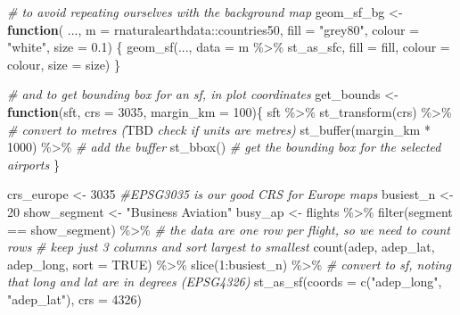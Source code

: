 \documentclass[
]{book}
\newenvironment{Shaded}{\begin{snugshade}}{\end{snugshade}}
\newcommand{\AlertTok}[1]{\textcolor[rgb]{0.94,0.16,0.16}{#1}}
\newcommand{\AttributeTok}[1]{\textcolor[rgb]{0.77,0.63,0.00}{#1}}
\newcommand{\CommentTok}[1]{\textcolor[rgb]{0.56,0.35,0.01}{\textit{#1}}}
\newcommand{\ConstantTok}[1]{\textcolor[rgb]{0.00,0.00,0.00}{#1}}
\newcommand{\ControlFlowTok}[1]{\textcolor[rgb]{0.13,0.29,0.53}{\textbf{#1}}}
\newcommand{\DecValTok}[1]{\textcolor[rgb]{0.00,0.00,0.81}{#1}}
\newcommand{\FloatTok}[1]{\textcolor[rgb]{0.00,0.00,0.81}{#1}}
\newcommand{\FunctionTok}[1]{\textcolor[rgb]{0.00,0.00,0.00}{#1}}
\newcommand{\NormalTok}[1]{#1}
\newcommand{\OtherTok}[1]{\textcolor[rgb]{0.56,0.35,0.01}{#1}}
\newcommand{\SpecialCharTok}[1]{\textcolor[rgb]{0.00,0.00,0.00}{#1}}
\newcommand{\StringTok}[1]{\textcolor[rgb]{0.31,0.60,0.02}{#1}}
\begin{document}
\begin{Shaded}
\begin{Highlighting}[]
\CommentTok{\# to avoid repeating ourselves with the background map}
\NormalTok{geom\_sf\_bg }\OtherTok{\textless{}{-}} \ControlFlowTok{function}\NormalTok{( ..., }\AttributeTok{m =}\NormalTok{ rnaturalearthdata}\SpecialCharTok{::}\NormalTok{countries50,}
                       \AttributeTok{fill =} \StringTok{"grey80"}\NormalTok{, }\AttributeTok{colour =} \StringTok{"white"}\NormalTok{, }\AttributeTok{size =} \FloatTok{0.1}\NormalTok{) \{}
  \FunctionTok{geom\_sf}\NormalTok{(..., }\AttributeTok{data =}\NormalTok{ m }\SpecialCharTok{\%\textgreater{}\%}\NormalTok{ st\_as\_sfc, }
          \AttributeTok{fill =}\NormalTok{ fill, }\AttributeTok{colour =}\NormalTok{ colour, }\AttributeTok{size =}\NormalTok{ size)}
\NormalTok{\}}

\CommentTok{\# and to get bounding box for an sf, in plot coordinates}
\NormalTok{get\_bounds }\OtherTok{\textless{}{-}} \ControlFlowTok{function}\NormalTok{(sft, }\AttributeTok{crs =} \DecValTok{3035}\NormalTok{, }\AttributeTok{margin\_km =} \DecValTok{100}\NormalTok{)\{}
\NormalTok{  sft }\SpecialCharTok{\%\textgreater{}\%} 
    \FunctionTok{st\_transform}\NormalTok{(crs) }\SpecialCharTok{\%\textgreater{}\%} \CommentTok{\# convert to metres (}\AlertTok{TBD}\CommentTok{ check if units are metres)}
    \FunctionTok{st\_buffer}\NormalTok{(margin\_km }\SpecialCharTok{*} \DecValTok{1000}\NormalTok{) }\SpecialCharTok{\%\textgreater{}\%}  \CommentTok{\# add the buffer}
    \FunctionTok{st\_bbox}\NormalTok{() }\CommentTok{\# get the bounding box for the selected airports}
\NormalTok{\}}

\NormalTok{crs\_europe }\OtherTok{\textless{}{-}} \DecValTok{3035} \CommentTok{\#EPSG3035 is our good CRS for Europe maps}
\NormalTok{busiest\_n }\OtherTok{\textless{}{-}} \DecValTok{20}
\NormalTok{show\_segment }\OtherTok{\textless{}{-}} \StringTok{"Business Aviation"}
\NormalTok{busy\_ap }\OtherTok{\textless{}{-}}\NormalTok{ flights }\SpecialCharTok{\%\textgreater{}\%} 
  \FunctionTok{filter}\NormalTok{(segment }\SpecialCharTok{==}\NormalTok{ show\_segment) }\SpecialCharTok{\%\textgreater{}\%} 
  \CommentTok{\# the data are one row per flight, so we need to count rows}
  \CommentTok{\# keep just 3 columns and sort largest to smallest}
  \FunctionTok{count}\NormalTok{(adep, adep\_lat, adep\_long, }\AttributeTok{sort =} \ConstantTok{TRUE}\NormalTok{) }\SpecialCharTok{\%\textgreater{}\%} 
  \FunctionTok{slice}\NormalTok{(}\DecValTok{1}\SpecialCharTok{:}\NormalTok{busiest\_n) }\SpecialCharTok{\%\textgreater{}\%} 
  \CommentTok{\# convert to sf, noting that long and lat are in degrees (EPSG4326)}
  \FunctionTok{st\_as\_sf}\NormalTok{(}\AttributeTok{coords =} \FunctionTok{c}\NormalTok{(}\StringTok{"adep\_long"}\NormalTok{, }\StringTok{"adep\_lat"}\NormalTok{), }\AttributeTok{crs =} \DecValTok{4326}\NormalTok{)}


\end{Highlighting}
\end{Shaded}
\end{document}
